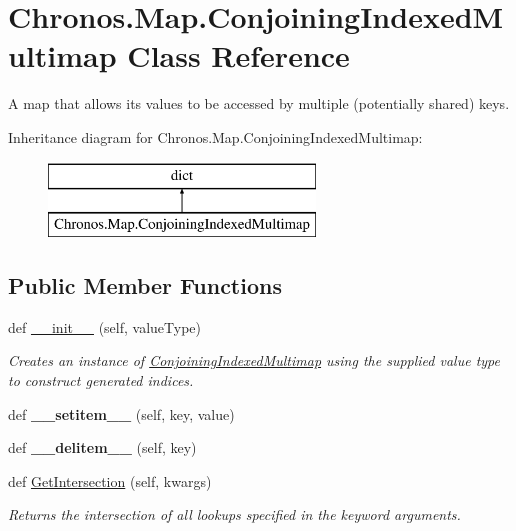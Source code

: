 \hypertarget{classChronos_1_1Map_1_1ConjoiningIndexedMultimap}{}\section{Chronos.\+Map.\+Conjoining\+Indexed\+Multimap Class Reference}
\label{classChronos_1_1Map_1_1ConjoiningIndexedMultimap}


A map that allows its values to be accessed by multiple (potentially shared) keys.  


Inheritance diagram for Chronos.\+Map.\+Conjoining\+Indexed\+Multimap\+:\begin{figure}[H]
\begin{center}
\leavevmode
\includegraphics[height=2.000000cm]{classChronos_1_1Map_1_1ConjoiningIndexedMultimap}
\end{center}
\end{figure}
\subsection*{Public Member Functions}
\begin{DoxyCompactItemize}
\item 
def \hyperlink{group__PyInfrastructure_gad33330f697b05ca2d3ecfc6b4e315306}{\+\_\+\+\_\+init\+\_\+\+\_\+} (self, value\+Type)
\begin{DoxyCompactList}\small\item\em Creates an instance of \hyperlink{classChronos_1_1Map_1_1ConjoiningIndexedMultimap}{Conjoining\+Indexed\+Multimap} using the supplied value type to construct generated indices. \end{DoxyCompactList}\item 
def {\bfseries \+\_\+\+\_\+setitem\+\_\+\+\_\+} (self, key, value)
\item 
def {\bfseries \+\_\+\+\_\+delitem\+\_\+\+\_\+} (self, key)
\item 
def \hyperlink{group__PyInfrastructure_gaf6acad2c10b1208a8f9a5f2d85de1865}{Get\+Intersection} (self, kwargs)
\begin{DoxyCompactList}\small\item\em Returns the intersection of all lookups specified in the keyword arguments. \end{DoxyCompactList}\end{DoxyCompactItemize}
